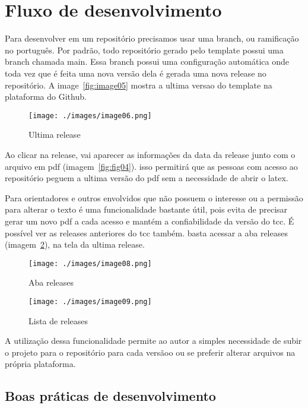 \section{Fluxo de desenvolvimento}\label{sec:figs}

Para desenvolver em um repositório precisamos usar uma branch, ou ramificação no português. Por padrão, todo repositório gerado pelo template possui uma branch chamada main. Essa branch possui uma configuração automática onde toda vez que é feita uma nova versão dela é gerada uma nova release no repositório. A image~\ref{fig:image05} mostra a ultima versao do template na plataforma do Github.

\begin{figure}[ht]
	\centering
	\texttt{[image: ./images/image06.png]}
	\caption{Ultima release}
	\label{fig:image06}
\end{figure}


Ao clicar na release, vai aparecer as informações da data da release junto com o arquivo em pdf (imagem~\ref{fig:fig04}). isso permitirá que as pessoas com acesso ao repositório peguem a ultima versão do pdf sem a necessidade de abrir o latex.

Para orientadores e outros envolvidos que não possuem o interesse ou a permissão para alterar o texto é uma funcionalidade bastante útil, pois evita de precisar gerar um novo pdf a cada acesso e mantém a confiabilidade da versão do tcc.
É possível ver as releases anteriores do tcc também. basta acessar a aba releases (imagem~\ref{fig:image08}), na tela da ultima release.


\begin{figure}[ht]
	\centering
	\texttt{[image: ./images/image08.png]}
	\caption{Aba releases}
	\label{fig:image08}
\end{figure}


\begin{figure}[ht]
	\centering
	\texttt{[image: ./images/image09.png]}
	\caption{Lista de releases}
	\label{fig:image09}
\end{figure}

A utilização dessa funcionalidade permite ao autor a simples necessidade de subir o projeto para o repositório para cada versãoo ou se preferir alterar arquivos na própria plataforma.

\subsection{Boas práticas de desenvolvimento}

